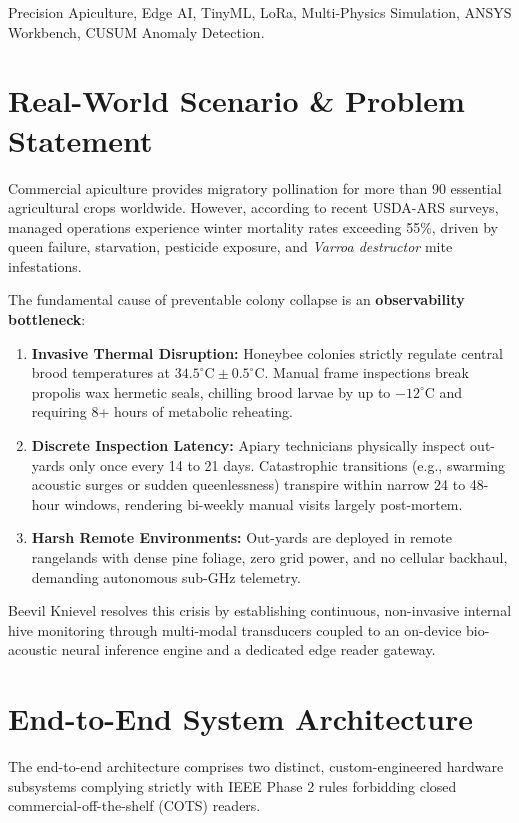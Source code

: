 \documentclass[10pt,conference,letterpaper]{IEEEtran}
\begin{document}
\begin{IEEEkeywords}
Precision Apiculture, Edge AI, TinyML, LoRa, Multi-Physics Simulation, ANSYS Workbench, CUSUM Anomaly Detection.
\end{IEEEkeywords}

\section{Real-World Scenario \& Problem Statement}
Commercial apiculture provides migratory pollination for more than 90 essential agricultural crops worldwide. However, according to recent USDA-ARS surveys, managed operations experience winter mortality rates exceeding 55\%, driven by queen failure, starvation, pesticide exposure, and \textit{Varroa destructor} mite infestations. 

The fundamental cause of preventable colony collapse is an \textbf{observability bottleneck}:
\begin{enumerate}
    \item \textbf{Invasive Thermal Disruption:} Honeybee colonies strictly regulate central brood temperatures at $34.5^\circ\text{C} \pm 0.5^\circ\text{C}$. Manual frame inspections break propolis wax hermetic seals, chilling brood larvae by up to $-12^\circ\text{C}$ and requiring 8+ hours of metabolic reheating.
    \item \textbf{Discrete Inspection Latency:} Apiary technicians physically inspect out-yards only once every 14 to 21 days. Catastrophic transitions (e.g., swarming acoustic surges or sudden queenlessness) transpire within narrow 24 to 48-hour windows, rendering bi-weekly manual visits largely post-mortem.
    \item \textbf{Harsh Remote Environments:} Out-yards are deployed in remote rangelands with dense pine foliage, zero grid power, and no cellular backhaul, demanding autonomous sub-GHz telemetry.
\end{enumerate}

Beevil Knievel resolves this crisis by establishing continuous, non-invasive internal hive monitoring through multi-modal transducers coupled to an on-device bio-acoustic neural inference engine and a dedicated edge reader gateway.

\section{End-to-End System Architecture}
The end-to-end architecture comprises two distinct, custom-engineered hardware subsystems complying strictly with IEEE Phase 2 rules forbidding closed commercial-off-the-shelf (COTS) readers.
\end{document}
